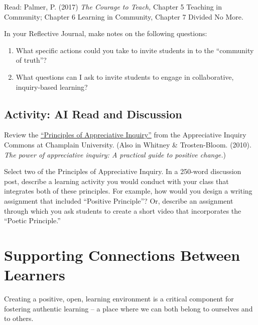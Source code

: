 \documentclass[
]{book}
\providecommand{\tightlist}{%
  \setlength{\itemsep}{0pt}\setlength{\parskip}{0pt}}
\begin{document}
\begin{reflect}
Read: Palmer, P. (2017) \emph{The Courage to Teach,} Chapter 5 Teaching
in Community; Chapter 6 Learning in Community, Chapter 7 Divided No
More.

In your Reflective Journal, make notes on the following questions:

\begin{enumerate}
\def\labelenumi{\arabic{enumi}.}
\tightlist
\item
  What specific actions could you take to invite students in to the
  ``community of truth''?
\item
  What questions can I ask to invite students to engage in
  collaborative, inquiry-based learning?
\end{enumerate}
\end{reflect}

\hypertarget{activity-ai-read-and-discussion}{%
\subsection{Activity: AI Read and Discussion}\label{activity-ai-read-and-discussion}}

\begin{reflect}
Review the
\href{https://appreciativeinquiry.champlain.edu/learn/appreciative-inquiry-introduction/5-classic-principles-ai/}{``Principles
of Appreciative Inquiry''} from the Appreciative Inquiry Commons at
Champlain University. (Also in Whitney \& Trosten-Bloom. (2010).
\emph{The power of appreciative inquiry: A practical guide to positive
change.})

Select two of the Principles of Appreciative Inquiry. In a 250-word
discussion post, describe a learning activity you would conduct with
your class that integrates both of these principles. For example, how
would you design a writing assignment that included ``Positive
Principle''? Or, describe an assignment through which you ask students
to create a short video that incorporates the ``Poetic Principle.''
\end{reflect}

\hypertarget{supporting-connections-between-learners}{%
\section{Supporting Connections Between Learners}\label{supporting-connections-between-learners}}

Creating a positive, open, learning environment is a critical component for fostering authentic learning -- a place where we can both belong to ourselves and to others.
\end{document}

